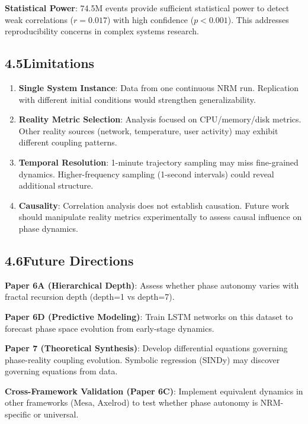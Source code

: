 \documentclass[11pt]{article}
\begin{document}
\noindent\textbf{Statistical Power}: 74.5M events provide sufficient statistical power to detect weak correlations ($r=0.017$) with high confidence ($p < 0.001$). This addresses reproducibility concerns in complex systems research.

\subsection*{4.5\quad Limitations}

\begin{enumerate}
    \item \textbf{Single System Instance}: Data from one continuous NRM run. Replication with different initial conditions would strengthen generalizability.
    \item \textbf{Reality Metric Selection}: Analysis focused on CPU/memory/disk metrics. Other reality sources (network, temperature, user activity) may exhibit different coupling patterns.
    \item \textbf{Temporal Resolution}: 1-minute trajectory sampling may miss fine-grained dynamics. Higher-frequency sampling (1-second intervals) could reveal additional structure.
    \item \textbf{Causality}: Correlation analysis does not establish causation. Future work should manipulate reality metrics experimentally to assess causal influence on phase dynamics.
\end{enumerate}

\subsection*{4.6\quad Future Directions}

\noindent\textbf{Paper 6A (Hierarchical Depth)}: Assess whether phase autonomy varies with fractal recursion depth (depth=1 vs depth=7).

\noindent\textbf{Paper 6D (Predictive Modeling)}: Train LSTM networks on this dataset to forecast phase space evolution from early-stage dynamics.

\noindent\textbf{Paper 7 (Theoretical Synthesis)}: Develop differential equations governing phase-reality coupling evolution. Symbolic regression (SINDy) may discover governing equations from data.

\noindent\textbf{Cross-Framework Validation (Paper 6C)}: Implement equivalent dynamics in other frameworks (Mesa, Axelrod) to test whether phase autonomy is NRM-specific or universal.
\end{document}

